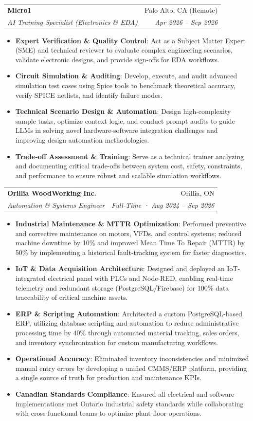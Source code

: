\documentclass[letterpaper,11pt]{article}
\makeatletter
\newcommand{\resumeItem}[2]{
  \item\small{
    \textbf{#1}{: #2 \vspace{-2pt}}
  }
}
\newcommand{\resumeSubheading}[4]{
  \vspace{-1pt}\item
    \begin{tabular*}{0.97\textwidth}{l@{\extracolsep{\fill}}r}
      \textbf{#1} & #2 \\
      \textit{\small#3} & \textit{\small #4} \\
    \end{tabular*}\vspace{-5pt}
}
\newcommand{\resumeItemListStart}{\begin{itemize}}
\newcommand{\resumeItemListEnd}{\end{itemize}\vspace{-5pt}}
\makeatother
\begin{document}
\resumeSubheading
    {Micro1}{Palo Alto, CA (Remote)}
    {AI Training Specialist (Electronics \& EDA)}{Apr 2026 -- Sep 2026}
  \resumeItemListStart
    \resumeItem{Expert Verification \& Quality Control}
      {Act as a Subject Matter Expert (SME) and technical reviewer to evaluate complex engineering scenarios, validate electronic designs, and provide sign-offs for EDA workflows.}
    \resumeItem{Circuit Simulation \& Auditing}
      {Develop, execute, and audit advanced simulation test cases using Spice tools to benchmark theoretical accuracy, verify SPICE netlists, and identify failure modes.}
    \resumeItem{Technical Scenario Design \& Automation}
      {Design high-complexity sample tasks, optimize context logic, and conduct prompt audits to guide LLMs in solving novel hardware-software integration challenges and improving design automation methodologies.}
    \resumeItem{Trade-off Assessment \& Training}
      {Serve as a technical trainer analyzing and documenting critical trade-offs between system cost, safety, constraints, and performance to ensure robust and scalable simulation workflows.}
  \resumeItemListEnd

\resumeSubheading
  {Orillia WoodWorking Inc.}{Orillia, ON}
  {Automation \& Systems Engineer}{Full-Time · Aug 2024 -- Sep 2026}
\resumeItemListStart
  \resumeItem{Industrial Maintenance \& MTTR Optimization}
    {Performed preventive and corrective maintenance on motors, VFDs, and control systems; reduced machine downtime by 10\% and improved Mean Time To Repair (MTTR) by 50\% by implementing a historical fault-tracking system for faster diagnostics.}
  \resumeItem{IoT \& Data Acquisition Architecture}
    {Designed and deployed an IoT-integrated electrical panel with PLCs and Node-RED, enabling real-time telemetry and redundant storage (PostgreSQL/Firebase) for 100\% data traceability of critical machine assets.}
  \resumeItem{ERP \& Scripting Automation}
    {Architected a custom PostgreSQL-based ERP, utilizing database scripting and automation to reduce administrative processing time by 40\% through automated material tracking, sales orders, and inventory synchronization for custom manufacturing workflows.}
  \resumeItem{Operational Accuracy}
    {Eliminated inventory inconsistencies and minimized manual entry errors by developing a unified CMMS/ERP platform, providing a single source of truth for production and maintenance KPIs.}
  \resumeItem{Canadian Standards Compliance}
    {Ensured all electrical and software implementations met Ontario industrial safety standards while collaborating with cross-functional teams to optimize plant-floor operations.}
\resumeItemListEnd
\end{document}
